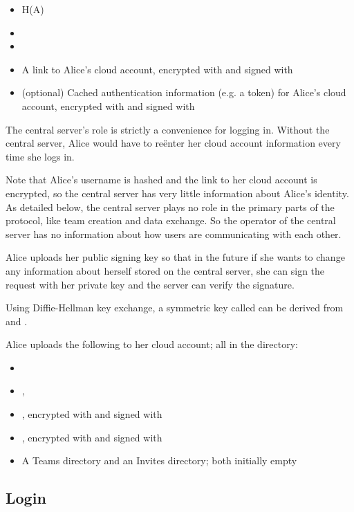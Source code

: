 \documentclass[pldi,10pt,preprint]{sigplanconf-pldi16}
\begin{document}
\begin{itemize}
\item H(A)
\item {}
\item {}
\item A link to Alice's cloud account, encrypted with  and signed with 
\item (optional) Cached authentication information (e.g. a token) for Alice's cloud account, encrypted with  and signed with 
\end{itemize}

The central server's role is strictly a convenience for logging in.
Without the central server, Alice would have to re\"{e}nter her cloud account information every time she logs in.

Note that Alice's username is hashed and the link to her cloud account is encrypted, so the central server has very little information about Alice's identity.
As detailed below, the central server plays no role in the primary parts of the protocol, like team creation and data exchange.
So the operator of the central server has no information about how users are communicating with each other.

Alice uploads her public signing key so that in the future if she wants to change any information about herself stored on the central server, she can sign the request with her private key and the server can verify the signature.

Using Diffie-Hellman key exchange, a symmetric key called  can be derived from  and .

Alice uploads the following to her cloud account; all in the  directory:

\begin{itemize}
\item {}
\item {}, 
\item {}, encrypted with  and signed with 
\item {}, encrypted with  and signed with 
\item A Teams directory and an Invites directory; both initially empty
\end{itemize}

\subsection{Login}
\end{document}
